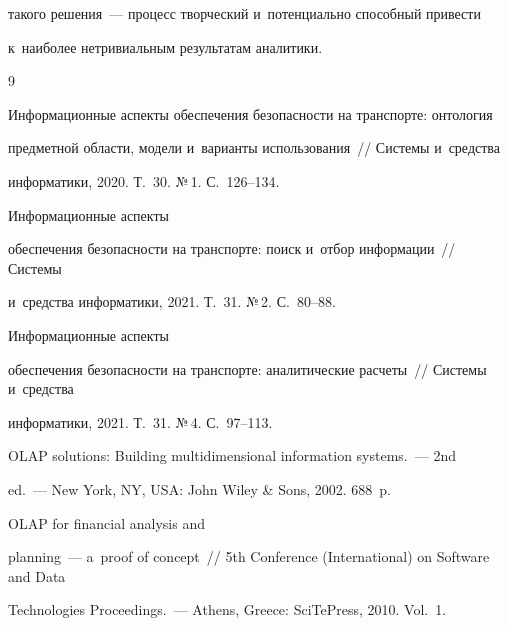 такого решения~--- процесс творческий и~потенциально способный привести


 к~наиболее нетривиальным результатам аналитики.





{\small\frenchspacing


{%




\begin{thebibliography}{9}






Информационные аспекты обеспечения безопас\-ности на транспорте: онтология 


предметной об\-ласти, модели и~варианты использования~/\!\!/ Системы и~средства 


информатики, 2020. Т.~30. №\,1. С.~126--134.




 Информационные аспекты 


обеспечения безопас\-ности на транспорте: поиск и~отбор информации~/\!\!/ Системы 


и~средства информатики, 2021. Т.~31. №\,2. С.~80--88.




 Информационные аспекты 


обеспечения безопас\-ности на транспорте: аналитические расчеты~/\!\!/ Системы и~средства 


информатики, 2021. Т.~31. №\,4. С.~97--113.




 OLAP solutions: Building multidimensional information systems.~--- 2nd  


ed.~--- New York, NY, USA: John Wiley \& Sons, 2002. 688~p.




 OLAP for financial analysis and 


planning~--- a~proof of concept~/\!\!/ 5th Conference (International) on Software and Data 


Technologies Proceedings.~--- Athens, Greece: SciTePress, 2010. Vol.~1.  



\end{thebibliography}}}
